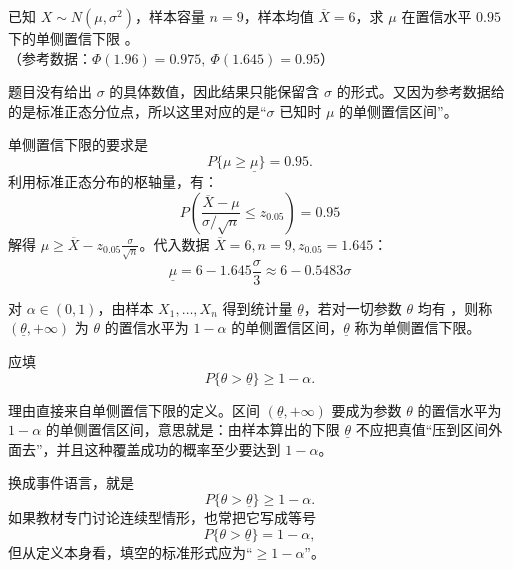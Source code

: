 ﻿\documentclass[lang=cn,11pt]{elegantbook}
\begin{document}
\begin{exercise} \label{prob:ci_4}
已知 $X\sim N(\mu,\sigma^2)$，样本容量 $n=9$，样本均值 $\overline{X}=6$，求 $\mu$ 在置信水平 $0.95$ 下的单侧置信下限 \underline{\qquad\qquad}。\\
（参考数据：$\Phi(1.96)=0.975,\ \Phi(1.645)=0.95$）
\end{exercise}
\begin{solution}
题目没有给出 \(\sigma\) 的具体数值，因此结果只能保留含 \(\sigma\) 的形式。又因为参考数据给的是标准正态分位点，所以这里对应的是“\(\sigma\) 已知时 \(\mu\) 的单侧置信区间”。

单侧置信下限的要求是
\[
P\{\mu \ge \underline{\mu}\}=0.95.
\]
利用标准正态分布的枢轴量，有：
\begin{equation*}
P\left( \frac{\overline{X}-\mu}{\sigma/\sqrt{n}} \le z_{0.05} \right) = 0.95
\end{equation*}
解得 $\mu \ge \overline{X} - z_{0.05}\frac{\sigma}{\sqrt{n}}$。代入数据 $\overline{X}=6, n=9, z_{0.05}=1.645$：
\begin{equation*}
\underline{\mu} = 6 - 1.645 \frac{\sigma}{3} \approx 6 - 0.5483\sigma
\end{equation*}
\end{solution}

\begin{exercise} \label{prob:ci_5}
对 $\alpha\in(0,1)$，由样本 $X_1,\dots,X_n$ 得到统计量 $\underline{\theta}$，若对一切参数 $\theta$ 均有 \underline{\qquad\qquad}，则称 $(\underline{\theta},+\infty)$ 为 $\theta$ 的置信水平为 $1-\alpha$ 的单侧置信区间，$\underline{\theta}$ 称为单侧置信下限。
\end{exercise}
\begin{solution}
应填
\[
P\{\theta>\underline{\theta}\}\ge 1-\alpha.
\]

理由直接来自单侧置信下限的定义。区间 \((\underline{\theta},+\infty)\) 要成为参数 \(\theta\) 的置信水平为 \(1-\alpha\) 的单侧置信区间，意思就是：由样本算出的下限 \(\underline{\theta}\) 不应把真值“压到区间外面去”，并且这种覆盖成功的概率至少要达到 \(1-\alpha\)。

换成事件语言，就是
\[
P\{\theta>\underline{\theta}\}\ge 1-\alpha.
\]
如果教材专门讨论连续型情形，也常把它写成等号
\[
P\{\theta>\underline{\theta}\}=1-\alpha,
\]
但从定义本身看，填空的标准形式应为“\(\ge 1-\alpha\)”。
\end{solution}
\end{document}
